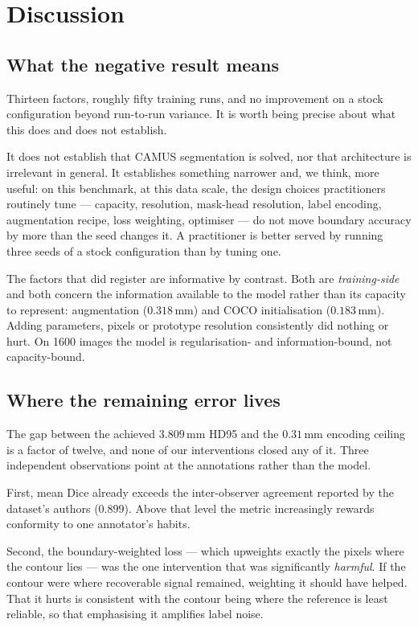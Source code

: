 \section{Discussion}
\label{sec:discussion}

\subsection{What the negative result means}

Thirteen factors, roughly fifty training runs, and no improvement on a stock
configuration beyond run-to-run variance. It is worth being precise about what
this does and does not establish.

It does not establish that CAMUS segmentation is solved, nor that architecture
is irrelevant in general. It establishes something narrower and, we think, more
useful: on this benchmark, at this data scale, the design choices practitioners
routinely tune --- capacity, resolution, mask-head resolution, label encoding,
augmentation recipe, loss weighting, optimiser --- do not move boundary accuracy
by more than the seed changes it. A practitioner is better served by running
three seeds of a stock configuration than by tuning one.

The factors that did register are informative by contrast. Both are
\emph{training-side} and both concern the information available to the model
rather than its capacity to represent: augmentation ($0.318$\,mm) and COCO
initialisation ($0.183$\,mm). Adding parameters, pixels or prototype resolution
consistently did nothing or hurt. On 1600 images the model is regularisation-
and information-bound, not capacity-bound.

\subsection{Where the remaining error lives}

The gap between the achieved $3.809$\,mm HD95 and the $0.31$\,mm encoding ceiling
is a factor of twelve, and none of our interventions closed any of it. Three
independent observations point at the annotations rather than the model.

First, mean Dice already exceeds the inter-observer agreement reported by the
dataset's authors ($0.899$). Above that level the metric increasingly rewards
conformity to one annotator's habits.

Second, the boundary-weighted loss --- which upweights exactly the pixels where
the contour lies --- was the one intervention that was significantly
\emph{harmful}. If the contour were where recoverable signal remained, weighting
it should have helped. That it hurts is consistent with the contour being where
the reference is least reliable, so that emphasising it amplifies label noise.

